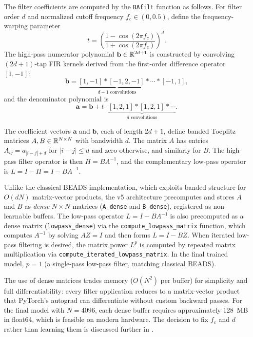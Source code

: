 The filter coefficients are computed by the \texttt{BAfilt} function as follows. For filter order $d$ and normalized cutoff frequency $f_c \in (0, 0.5)$, define the frequency-warping parameter
\begin{equation}
    t = \left(\frac{1 - \cos(2\pi f_c)}{1 + \cos(2\pi f_c)}\right)^d.
\end{equation}
The high-pass numerator polynomial $\mathbf{b} \in {\mathbb R}^{2d+1}$ is constructed by convolving $(2d+1)$-tap FIR kernels derived from the first-order difference operator $[1, -1]$:
\begin{equation}
    \mathbf{b} = \underbrace{[1, -1] * [-1, 2, -1] * \cdots}_{d-1 \text{ convolutions}} * [-1, 1],
\end{equation}
and the denominator polynomial is
\begin{equation}
    \mathbf{a} = \mathbf{b} + t \cdot \underbrace{[1, 2, 1] * [1, 2, 1] * \cdots}_{d \text{ convolutions}}.
\end{equation}

The coefficient vectors $\mathbf{a}$ and $\mathbf{b}$, each of length $2d+1$, define banded Toeplitz matrices $A, B \in {\mathbb R}^{N \times N}$ with bandwidth $d$. The matrix $A$ has entries $A_{ij} = a_{|i-j|+d}$ for $|i-j| \leq d$ and zero otherwise, and similarly for $B$. The high-pass filter operator is then $H = BA^{-1}$, and the complementary low-pass operator is $L = I - H = I - BA^{-1}$.

Unlike the classical BEADS implementation, which exploits banded structure for $O(dN)$ matrix-vector products, the v5 architecture precomputes and stores $A$ and $B$ as \emph{dense} $N \times N$ matrices (\texttt{A\_dense} and \texttt{B\_dense}), registered as non-learnable buffers. The low-pass operator $L = I - BA^{-1}$ is also precomputed as a dense matrix (\texttt{lowpass\_dense}) via the \texttt{compute\_lowpass\_matrix} function, which computes $A^{-1}$ by solving $A Z = I$ and then forms $L = I - BZ$. When iterated low-pass filtering is desired, the matrix power $L^p$ is computed by repeated matrix multiplication via \texttt{compute\_iterated\_lowpass\_matrix}. In the final trained model, $p = 1$ (a single-pass low-pass filter, matching classical BEADS).

The use of dense matrices trades memory ($O(N^2)$ per buffer) for simplicity and full differentiability: every filter application reduces to a matrix-vector product that PyTorch's autograd can differentiate without custom backward passes. For the final model with $N = 4096$, each dense buffer requires approximately 128~MB in float64, which is feasible on modern hardware. The decision to fix $f_c$ and $d$ rather than learning them is discussed further in .


